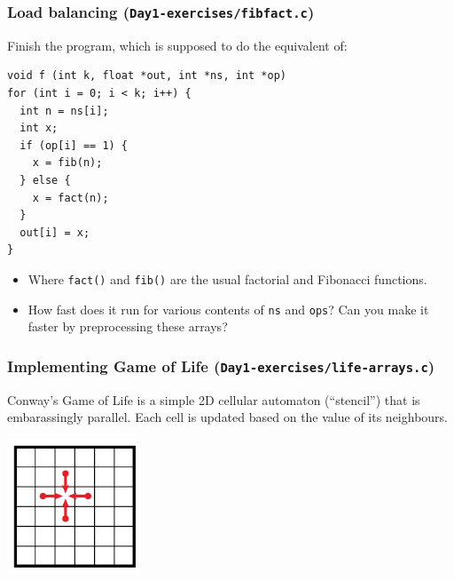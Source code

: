 \documentclass{beamer}
\begin{document}
\begin{frame}[fragile]
  \frametitle{Load balancing (\texttt{Day1-exercises/fibfact.c})}

  Finish the program, which is supposed to do the equivalent of:

\begin{lstlisting}
void f (int k, float *out, int *ns, int *op)
for (int i = 0; i < k; i++) {
  int n = ns[i];
  int x;
  if (op[i] == 1) {
    x = fib(n);
  } else {
    x = fact(n);
  }
  out[i] = x;
}
\end{lstlisting}

  \begin{itemize}
  \item Where \texttt{fact()} and \texttt{fib()} are the usual
    factorial and Fibonacci functions.
  \item How fast does it run for various contents of \texttt{ns} and
    \texttt{ops}?  Can you make it faster by preprocessing these
    arrays?
  \end{itemize}

\end{frame}

\begin{frame}
  \frametitle{Implementing Game of Life (\texttt{Day1-exercises/life-arrays.c})}

  Conway's Game of Life is a simple 2D cellular automaton
  (``stencil'') that is embarassingly parallel.  Each cell is updated
  based on the value of its neighbours.

  \begin{center}
    \includegraphics[width=4cm]{img/stencil.png}
  \end{center}

\end{frame}
\end{document}
